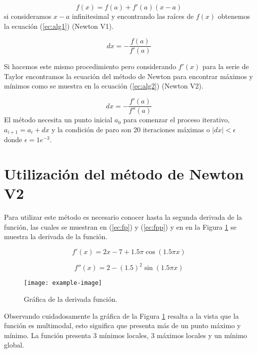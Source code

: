 \documentclass[conference]{IEEEtran}
\begin{document}
\begin{equation}
f(x) = f(a) + f'(a) (x-a)
\label{ec:taylor2}
\end{equation}
si consideramos $x-a$ infinitesimal y encontrando las raíces de $f(x)$ obtenemos la ecuación (\ref{ec:alg1}) (Newton V1).

\begin{equation}
dx = - \frac{f(a)}{f'(a)}
\label{ec:alg1}
\end{equation}

Si hacemos este mismo procedimiento pero considerando $f'(x)$ para la serie de Taylor encontramos la ecuación del método de Newton para encontrar máximos y mínimos como se muestra en la ecuación (\ref{ec:alg2}) (Newton V2).

\begin{equation}
dx = - \frac{f'(a)}{f''(a)}
\label{ec:alg2}
\end{equation}
El método necesita un punto inicial $a_{0}$ para comenzar el proceso iterativo, $a_{i+1} = a_{i} + dx$ y la condición de paro son 20 iteraciones máximas o $|dx| < \epsilon$ donde $\epsilon =  1e^{-3}$.

\section{Utilización del método de Newton V2}

Para utilizar este método es necesario conocer hasta la segunda derivada de la función, las cuales se muestran en (\ref{ec:fp}) y (\ref{ec:fpp}) y en en la Figura \ref{fig:fp} se muestra la derivada de la función.

\begin{equation}
f'(x) = 2x -7 + 1.5 \pi \cos(1.5 \pi x)
\label{ec:fp}
\end{equation}

\begin{equation}
f''(x) = 2 -(1.5)^{2} \sin(1.5 \pi x)
\label{ec:fpp}
\end{equation}

\begin{figure}[hbtp]
\centering
\texttt{[image: example-image]} 
\caption{Gráfica de la derivada función.}
\label{fig:fp}
\end{figure}

Observando cuidadosamente la gráfica de la Figura \ref{fig:fp} resalta a la vista que la función es multimodal, esto significa que presenta más de un punto máximo y mínimo. La función presenta 3 mínimos locales, 3 máximos locales y un mínimo global. 
\end{document}
